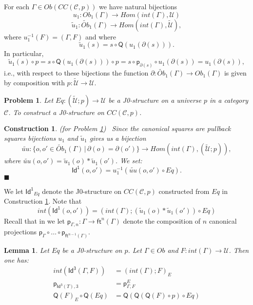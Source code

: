\documentclass[12pt]{article}
\numberwithin{equation}{section}
\newenvironment{eq}{\begin{equation}}{\end{equation}}
\newtheorem{lemma}[proposition]{Lemma}
\newtheorem{problem}[proposition]{Problem}
\newtheorem{construction0}[proposition]{Construction}
\newenvironment{construction}[1]{\begin{construction0}(for Problem \ref{#1})\ }{$\blacksquare$ \end{construction0}}
\newcommand{\llabel}[1]{\label{#1}}
\newcommand{\sr}{\rightarrow}
\newcommand{\wt}{\widetilde}
\newcommand{\toCC}{CC} %
\newcommand{\ft}{\mathsf{ft}}
\newcommand{\p}{\mathsf{p}}
\newcommand{\Id}{\mathsf{Id^1}} %
\newcommand{\Idx}{\mathsf{Id^3}} %
\newcommand{\U}{\mathcal{U}}
\newcommand{\Q}{\mathsf{Q}}
\begin{document}
For each $\Gamma\in Ob(\toCC({\mathcal C},p))$ we have natural bijections
%
\begin{eq}
\llabel{2015.03.27.eq7b} u_1:Ob_1(\Gamma)\sr Hom(int(\Gamma),\U)
\end{eq}%
%
\begin{eq}
\llabel{2015.03.27.eq7a} \wt{u}_1:\wt{Ob}_1(\Gamma)\sr Hom(int(\Gamma),\wt{\U}),
\end{eq}%
%
where $u_1^{-1}(F)=(\Gamma,F)$ and where
%
\begin{eq}
\llabel{2015.03.31.eq5} \wt{u}_1(s)=s\circ \Q(u_1(\partial(s))).
\end{eq}%
%
In particular,
%
$$\wt{u}_1(s)\circ p=s\circ \Q(u_1(\partial(s)))\circ p=s\circ
\p_{\partial(s)}\circ u_1(\partial(s))=u_1(\partial(s)),$$
%
i.e., with respect to these bijections the function
$\partial:\wt{Ob}_1(\Gamma)\sr Ob_1(\Gamma)$ is given by composition with
$p:\wt{\U}\sr \U$.
%
\begin{problem}
\llabel{2015.03.27.prob3} Let $Eq:(\wt{\U};p)\sr \U$ be a J0-structure on a
universe $p$ in a category $\mathcal C$. To construct a J0-structure on
$\toCC({\mathcal C},p)$.
\end{problem}
%
\begin{construction}{2015.03.27.prob3}\rm
\llabel{2015.03.27.constr3} Since the canonical squares are pullback squares
bijections $u_1$ and $\wt{u}_1$ gives us a bijection
%
$$\wt{uu}:\{o,o'\in\wt{Ob}_1(\Gamma)\,|\,\partial(o)=\partial(o')\} \sr
Hom(int(\Gamma),(\wt{\U};p)),$$
%
where $\wt{uu}(o,o')=\wt{u}_1(o)*\wt{u}_1(o')$. We set:
%
$$\Id(o,o')=u_1^{-1}(\wt{uu}(o,o')\circ Eq).$$
%
\end{construction}
%
We let $\Id_{Eq}$ denote the J0-structure on $\toCC({\mathcal C},p)$ constructed
from $Eq$ in Construction \ref{2015.03.27.constr3}. Note that
%
\begin{eq}
\llabel{2015.03.31.eq1}
int(\Id(o,o'))=(int(\Gamma);(\wt{u}_1(o)*\wt{u}_1(o'))\circ Eq)
\end{eq}%
%
Recall that in \cite{Csubsystems} we let $\p_{\Gamma,n}:\Gamma\sr \ft^n(\Gamma)$
denote the composition of $n$ canonical projections $\p_{\Gamma}\circ \dots\circ
\p_{\ft^{n-1}(\Gamma)}$.
%
\begin{lemma}
\llabel{2015.03.27.l1} Let $Eq$ be a J0-structure on $p$. Let $\Gamma\in Ob$
and $F:int(\Gamma)\sr \U$. Then one has:
%
\begin{align*}
  int(\Idx(\Gamma,F))&=(int(\Gamma);F)_{E} \\
  \p_{\Idx(T),3} &= \p^E_{\Gamma,F} \\
  \Q(F)_{E}\circ \Q(Eq)&=\Q(\Q(\Q(F)\circ p)\circ Eq)
\end{align*}
%
%
\end{lemma}
\end{document}
